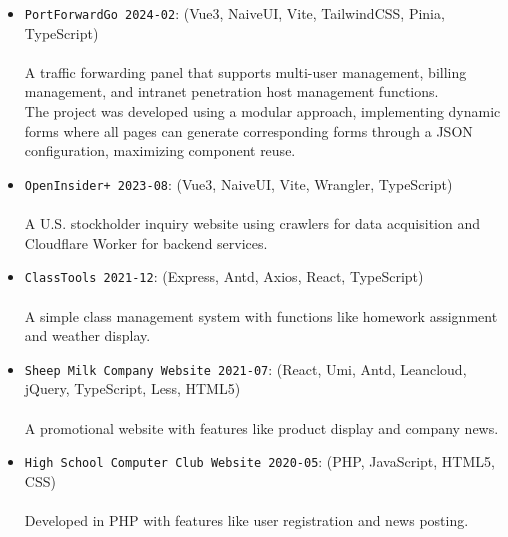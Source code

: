 \documentclass{resume}
\begin{document}
\begin{itemize}
  \item \texttt{PortForwardGo 2024-02}:
    (Vue3, NaiveUI, Vite, TailwindCSS, Pinia, TypeScript)\\
    \\
    A traffic forwarding panel that supports multi-user management, billing management,
    and intranet penetration host management functions.\\
    The project was developed using a modular approach,
    implementing dynamic forms where all pages can generate corresponding forms through a JSON configuration,
    maximizing component reuse.\\
  \item \texttt{OpenInsider+ 2023-08}:
    (Vue3, NaiveUI, Vite, Wrangler, TypeScript)\\
    \\
    A U.S. stockholder inquiry website using crawlers for data acquisition and Cloudflare Worker for backend services.\\
  \item \texttt{ClassTools 2021-12}:
    (Express, Antd, Axios, React, TypeScript)\\
    \\
    A simple class management system with functions like homework assignment and weather display.\\
  \item \texttt{Sheep Milk Company Website 2021-07}:
    (React, Umi, Antd, Leancloud, jQuery, TypeScript, Less, HTML5)\\
    \\
    A promotional website with features like product display and company news.\\
  \item \texttt{High School Computer Club Website 2020-05}:
    (PHP, JavaScript, HTML5, CSS)\\
    \\
    Developed in PHP with features like user registration and news posting.\\
\end{itemize}
\end{document}
